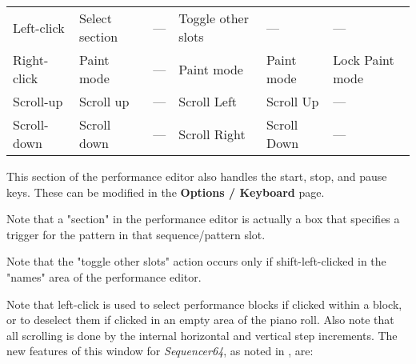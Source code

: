 \begin{table}[H]
\begin{tabular}{l l l l l l}
         Left-click        & Select section  & ---                & Toggle other slots & ---             & ---                \\
         Right-click       & Paint mode      & ---                & Paint mode         & Paint mode      & Lock Paint mode    \\
         Scroll-up         & Scroll up       & ---                & Scroll Left        & Scroll Up       & ---                \\
         Scroll-down       & Scroll down     & ---                & Scroll Right       & Scroll Down     & ---                \\
      \end{tabular}
   \end{table}

   This section of the performance editor also handles the start, stop, and
   pause keys.  These can be modified in the \textbf{Options / Keyboard} page.

   Note that a "section" in the performance editor is actually a box that
   specifies a trigger for the pattern in that sequence/pattern slot.

   Note that the "toggle other slots" action occurs only if shift-left-clicked
   in the "names" area of the performance editor.

   Note that left-click is used to select performance blocks if clicked within
   a block, or to deselect them if clicked in an empty area of the piano roll.
   Also note that all scrolling is done by the internal horizontal and vertical
   step increments.
   The new features of this window for \textsl{Sequencer64},
   as noted in , are:

